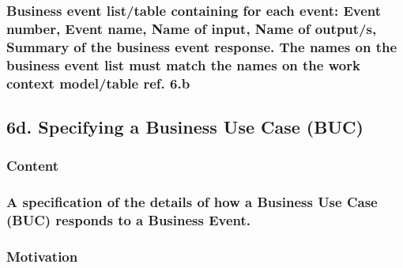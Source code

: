 \documentclass[
]{article}
\begin{document}
\hypertarget{business-event-listtable-containing-for-each-event-event-number-event-name-name-of-input-name-of-outputs-summary-of-the-business-event-response.-the-names-on-the-business-event-list-must-match-the-names-on-the-work-context-modeltable-ref.-6.b}{%
\subsubsection{Business event list/table containing for each event:
Event number, Event name, Name of input, Name of output/s, Summary of
the business event response. The names on the business event list must
match the names on the work context model/table ref.
6.b}\label{business-event-listtable-containing-for-each-event-event-number-event-name-name-of-input-name-of-outputs-summary-of-the-business-event-response.-the-names-on-the-business-event-list-must-match-the-names-on-the-work-context-modeltable-ref.-6.b}}

\hypertarget{d.-specifying-a-business-use-case-buc}{%
\subsection{6d. Specifying a Business Use Case
(BUC)}\label{d.-specifying-a-business-use-case-buc}}

\hypertarget{content-25}{%
\subsubsection{Content}\label{content-25}}

\hypertarget{a-specification-of-the-details-of-how-a-business-use-case-buc-responds-to-a-business-event.}{%
\subsubsection{A specification of the details of how a Business Use Case
(BUC) responds to a Business
Event.}\label{a-specification-of-the-details-of-how-a-business-use-case-buc-responds-to-a-business-event.}}

\hypertarget{motivation-25}{%
\subsubsection{Motivation}\label{motivation-25}}
\end{document}
